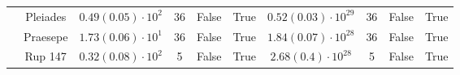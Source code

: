 \begin{tabular}{lccccccccr}
          & Pleiades &    $0.49\left(0.05\right)\cdot 10^{2}$ &             36 &           False &            True &        $0.52\left(0.03\right)\cdot 10^{29}$ &               36 &             False &              True \\
          & Praesepe &    $1.73\left(0.06\right)\cdot 10^{1}$ &             36 &           False &            True &        $1.84\left(0.07\right)\cdot 10^{28}$ &               36 &             False &              True \\
          & Rup 147 &    $0.32\left(0.08\right)\cdot 10^{2}$ &              5 &           False &            True &         $2.68\left(0.4\right)\cdot 10^{28}$ &                5 &             False &              True \\
\hline

\end{tabular}
